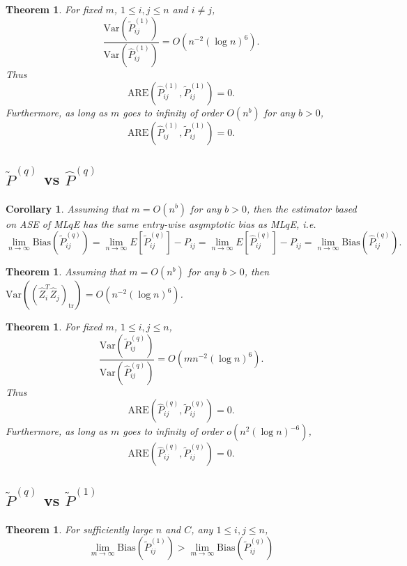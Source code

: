 \documentclass[a4paper]{article}
\newtheorem{theorem}[fact]{Theorem}
\newtheorem{corollary}[fact]{Corollary}
\renewcommand{\hat}{\widehat}
\begin{document}
\begin{theorem}
\label{thm:AREL1}
For fixed $m$, $1 \le i, j \le n$ and $i \ne j$,
\[
	\frac{\mathrm{Var}(\widetilde{P}_{ij}^{(1)})}{\mathrm{Var}(\hat{P}_{ij}^{(1)})}
    = O(n^{-2} (\log n)^6).
\]
Thus
\[
	\mathrm{ARE}(\hat{P}_{ij}^{(1)}, \widetilde{P}_{ij}^{(1)}) = 0.
\]
Furthermore, as long as $m$ goes to infinity of order $O(n^b)$ for any $b > 0$,
\[
	\mathrm{ARE}(\hat{P}_{ij}^{(1)}, \widetilde{P}_{ij}^{(1)}) = 0.
\]
\end{theorem}





\subsection{$\widetilde{P}^{(q)}$ vs $\hat{P}^{(q)}$}
\begin{corollary}
\label{cor:LqConsistent}
Assuming that $m = O(n^b)$ for any $b > 0$, then the estimator based on ASE of ML$q$E has the same entry-wise asymptotic bias as ML$q$E, i.e.
\[
	\lim_{n \to \infty} \mathrm{Bias}(\widetilde{P}_{ij}^{(q)}) = \lim_{n \to \infty} E[\widetilde{P}_{ij}^{(q)}] - P_{ij} = \lim_{n \to \infty} E[\hat{P}^{(q)}_{ij}] - P_{ij}
    = \lim_{n \to \infty} \mathrm{Bias}(\hat{P}_{ij}^{(q)}).
\]
\end{corollary}

\begin{theorem}
\label{thm:VarASELq}
Assuming that $m = O(n^b)$ for any $b > 0$, then $\mathrm{Var}((\hat{Z}_i^T \hat{Z}_j)_{\mathrm{tr}}) = O(n^{-2} (\log n)^6)$.
\end{theorem}

\begin{theorem}
\label{thm:ARELq}
For fixed $m$, $1 \le i, j \le n$,
\[
	\frac{\mathrm{Var}(\widetilde{P}_{ij}^{(q)})}{\mathrm{Var}(\hat{P}_{ij}^{(q)})}
    = O(m n^{-2} (\log n)^6).
\]
Thus
\[
	\mathrm{ARE}(\hat{P}_{ij}^{(q)}, \widetilde{P}_{ij}^{(q)}) = 0.
\]
Furthermore, as long as $m$ goes to infinity of order $o(n^2 (\log n)^{-6})$,
\[
	\mathrm{ARE}(\hat{P}_{ij}^{(q)}, \widetilde{P}_{ij}^{(q)}) = 0.
\]
\end{theorem}




\subsection{$\widetilde{P}^{(q)}$ vs $\widetilde{P}^{(1)}$}

\begin{theorem}
\label{thm:biasL1andLq}
For sufficiently large $n$ and $C$, any $1 \le i,j \le n$,
\[
	\lim_{m \to \infty} \mathrm{Bias}(\widetilde{P}_{ij}^{(1)})
    > \lim_{m \to \infty} \mathrm{Bias}(\widetilde{P}_{ij}^{(q)})
\]
\end{theorem}
\end{document}
